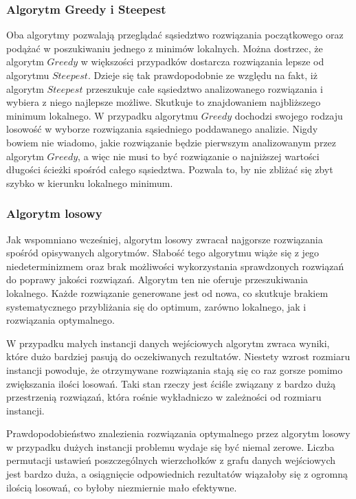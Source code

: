 \subsubsection{Algorytm Greedy i Steepest}

Oba algorytmy pozwalają przeglądać sąsiedztwo rozwiązania początkowego
oraz podążać w poszukiwaniu jednego z minimów lokalnych.
Można dostrzec, że algorytm $Greedy$ w większości przypadków dostarcza
rozwiązania lepsze od algorytmu $Steepest$. Dzieje się tak prawdopodobnie
ze względu na fakt, iż algorytm $Steepest$ przeszukuje całe sąsiedztwo
analizowanego rozwiązania i wybiera z niego najlepsze możliwe. Skutkuje
to znajdowaniem najbliższego minimum lokalnego. W przypadku algorytmu
$Greedy$ dochodzi swojego rodzaju losowość w wyborze rozwiązania
sąsiedniego poddawanego analizie. Nigdy bowiem nie wiadomo, jakie
rozwiązanie będzie pierwszym analizowanym przez algorytm $Greedy$,
a więc nie musi to być rozwiązanie o najniższej wartości długości
ścieżki spośród całego sąsiedztwa. Pozwala to, by nie zbliżać
się zbyt szybko w kierunku lokalnego minimum.

\subsubsection{Algorytm losowy}

Jak wspomniano wcześniej, algorytm losowy zwracał najgorsze rozwiązania spośród
opisywanych algorytmów. Słabość tego algorytmu wiąże się z jego niedeterminizmem
oraz brak możliwości wykorzystania sprawdzonych rozwiązań do poprawy jakości
rozwiązań. Algorytm ten nie oferuje przeszukiwania lokalnego. Każde rozwiązanie
generowane jest od nowa, co skutkuje brakiem systematycznego przybliżania
się do optimum, zarówno lokalnego, jak i rozwiązania optymalnego.

W przypadku małych instancji danych wejściowych algorytm zwraca wyniki, które
dużo bardziej pasują do oczekiwanych rezultatów. Niestety wzrost rozmiaru
instancji powoduje, że otrzymywane rozwiązania stają się co raz gorsze
pomimo zwiększania ilości losowań. Taki stan rzeczy jest ściśle
związany z bardzo dużą przestrzenią rozwiązań, która rośnie wykładniczo
w zależności od rozmiaru instancji.

Prawdopodobieństwo znalezienia rozwiązania optymalnego przez algorytm
losowy w przypadku dużych instancji problemu wydaje się
być niemal zerowe. Liczba permutacji ustawień poszczególnych wierzchołków
z grafu danych wejściowych jest bardzo duża, a osiągnięcie odpowiednich
rezultatów wiązałoby się z ogromną ilością losowań, co byłoby niezmiernie
mało efektywne.

